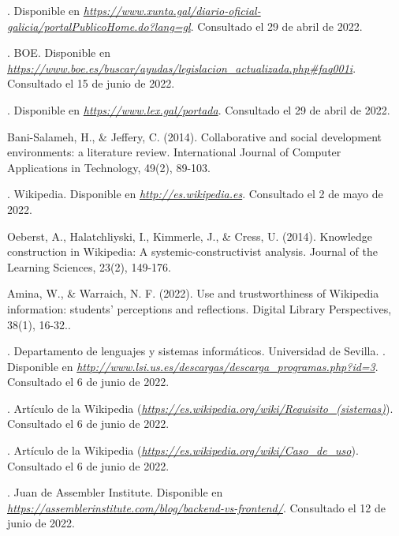 

\begin{thebibliography}{99}

. Disponible en {\it \url{https://www.xunta.gal/diario-oficial-galicia/portalPublicoHome.do?lang=gl}}. Consultado el 29 de abril de 2022.

. BOE. Disponible en {\it \url{https://www.boe.es/buscar/ayudas/legislacion_actualizada.php#faq001i}}. Consultado el 15 de junio de 2022.

. Disponible en {\it \url{https://www.lex.gal/portada}}. Consultado el 29 de abril de 2022.

 Bani-Salameh, H., \& Jeffery, C. (2014). Collaborative and social development environments: a literature review. International Journal of Computer Applications in Technology, 49(2), 89-103.

. Wikipedia. Disponible en {\it \url{http://es.wikipedia.es}}. Consultado el 2 de mayo de 2022.

 Oeberst, A., Halatchliyski, I., Kimmerle, J., \& Cress, U. (2014). Knowledge construction in Wikipedia: A systemic-constructivist analysis. Journal of the Learning Sciences, 23(2), 149-176.

 Amina, W., \& Warraich, N. F. (2022). Use and trustworthiness of Wikipedia information: students’ perceptions and reflections. Digital Library Perspectives, 38(1), 16-32..

. Departamento de lenguajes y sistemas informáticos. Universidad de Sevilla. . Disponible en {\it \url{http://www.lsi.us.es/descargas/descarga_programas.php?id=3}}. Consultado el 6 de junio de 2022.

. Artículo de la Wikipedia ({\it \url{https://es.wikipedia.org/wiki/Requisito_(sistemas)}}). Consultado el 6 de junio de 2022.

. Artículo de la Wikipedia ({\it \url{https://es.wikipedia.org/wiki/Caso_de_uso}}). Consultado el 6 de junio de 2022.

. Juan de Assembler Institute. Disponible en {\it \url{https://assemblerinstitute.com/blog/backend-vs-frontend/}}. Consultado el 12 de junio de 2022.


\end{thebibliography}
